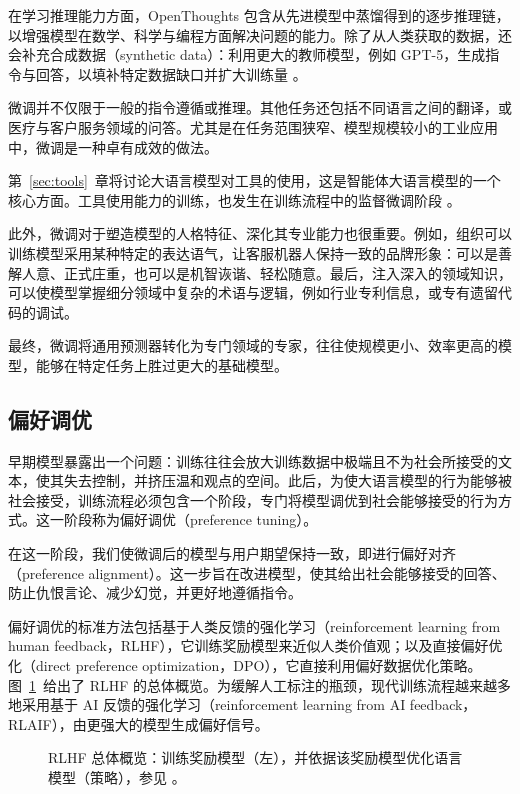 在学习推理能力方面，OpenThoughts \citep{guha2025openthoughts} 包含从先进模型中蒸馏得到的逐步推理链，以增强模型在数学、科学与编程方面解决问题的能力。除了从人类获取的数据，还会补充合成数据（synthetic data）：利用更大的教师模型，例如 GPT-5，生成指令与回答，以填补特定数据缺口并扩大训练量 \citep{zhang2026instruction}。

微调并不仅限于一般的指令遵循或推理。其他任务还包括不同语言之间的翻译，或医疗与客户服务领域的问答。尤其是在任务范围狭窄、模型规模较小的工业应用中，微调是一种卓有成效的做法。

第~\ref{sec:tools}~章将讨论大语言模型对工具的使用，这是智能体大语言模型的一个核心方面。工具使用能力的训练，也发生在训练流程中的监督微调阶段 \citep{wei2022emergent,minaee2024large}。

此外，微调对于塑造模型的人格特征、深化其专业能力也很重要。例如，组织可以训练模型采用某种特定的表达语气，让客服机器人保持一致的品牌形象：可以是善解人意、正式庄重，也可以是机智诙谐、轻松随意。最后，注入深入的领域知识，可以使模型掌握细分领域中复杂的术语与逻辑，例如行业专利信息，或专有遗留代码的调试。

最终，微调将通用预测器转化为专门领域的专家，往往使规模更小、效率更高的模型，能够在特定任务上胜过更大的基础模型。

\subsection{偏好调优}
早期模型暴露出一个问题：训练往往会放大训练数据中极端且不为社会所接受的文本，使其失去控制，并挤压温和观点的空间。此后，为使大语言模型的行为能够被社会接受，训练流程必须包含一个阶段，专门将模型调优到社会能够接受的行为方式。这一阶段称为偏好调优（preference tuning）。

在这一阶段，我们使微调后的模型与用户期望保持一致，即进行偏好对齐（preference alignment）。这一步旨在改进模型，使其给出社会能够接受的回答、防止仇恨言论、减少幻觉，并更好地遵循指令。

偏好调优的标准方法包括基于人类反馈的强化学习（reinforcement learning from human feedback，RLHF）\citep{ouyang2022training}，它训练奖励模型来近似人类价值观；以及直接偏好优化（direct preference optimization，DPO）\citep{rafailov2024direct}，它直接利用偏好数据优化策略。图~\ref{fig:rlhf-loop}~给出了 RLHF 的总体概览。为缓解人工标注的瓶颈，现代训练流程越来越多地采用基于 AI 反馈的强化学习（reinforcement learning from AI feedback，RLAIF）\citep{bai2022constitutional}，由更强大的模型生成偏好信号。

\begin{figure}[tb]
    \centering
    
    \caption{RLHF 总体概览：训练奖励模型（左），并依据该奖励模型优化语言模型（策略），参见 \citet{dong2024rlhf}。}
    \label{fig:rlhf-loop}
\end{figure}

